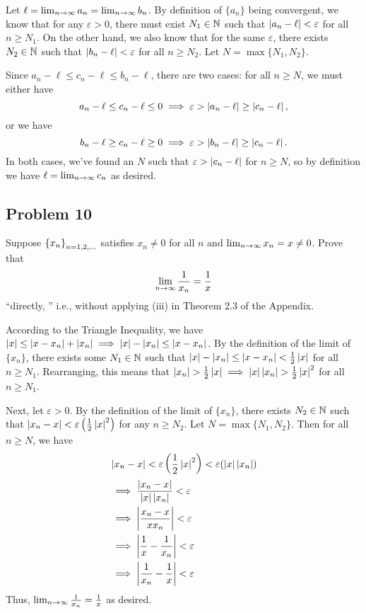 \documentclass[main.tex]{subfiles}
\begin{document}
\begin{soln}
    Let $\ell = \lim_{n\to \infty} a_n = \lim_{n\to \infty} b_n$. By definition of $\{a_n\}$ being convergent, we know that for any $\varepsilon > 0$, there must exist $N_1\in \mathbb N$ such that $\left\lvert a_n - \ell \right\rvert < \varepsilon$ for all $n\ge N_1$. On the other hand, we also know that for the same $\varepsilon$, there exists $N_2\in \mathbb N$ such that $\left\lvert b_n - \ell \right\rvert < \varepsilon$ for all $n\ge N_2$. Let $N = \max \{N_1, N_2\}$.
    
    Since $a_n - \ell \le c_n - \ell \le b_n - \ell$, there are two cases: for all $n\ge N$, we must either have
    \[a_n - \ell \le c_n - \ell \le 0\implies \varepsilon > \left\lvert a_n - \ell \right\rvert \ge \left\lvert c_n - \ell \right\rvert,\]
    or we have
    \[b_n - \ell \ge c_n - \ell \ge 0\implies \varepsilon > \left\lvert b_n - \ell \right\rvert \ge \left\lvert c_n - \ell \right\rvert.\]
    In both cases, we've found an $N$ such that $\varepsilon > \left\lvert c_n - \ell \right\rvert$ for $n\ge N$, so by definition we have $\ell = \lim_{n\to \infty} c_n$ as desired.
\end{soln}
\eject

\subsection{Problem 10}
\begin{claim}
    Suppose $\left\{ x_n \right\}_{n=1,2,\ldots}$ satisfies $x_n \neq 0$ for all $n$ and $\lim_{n\to \infty} x_n = x \neq 0$. Prove that
    \[\lim_{n\to \infty}\frac{1}{x_n} = \frac{1}{x}\]
    “directly, ” i.e., without applying (iii) in Theorem 2.3 of the Appendix.
\end{claim}

\begin{soln}
    According to the Triangle Inequality, we have $\left\lvert x \right\rvert\le \left\lvert x - x_n \right\rvert + \left\lvert x_n \right\rvert\implies \left\lvert x \right\rvert - \left\lvert x_n \right\rvert \le \left\lvert x - x_n \right\rvert$. By the definition of the limit of $\{x_n\}$, there exists some $N_1\in \mathbb N$ such that $\left\lvert x \right\rvert - \left\lvert x_n \right\rvert \le \left\lvert x - x_n \right\rvert < \frac{1}{2}\left\lvert x \right\rvert$ for all $n\ge N_1$. Rearranging, this means that $\left\lvert x_n \right\rvert > \frac{1}{2}\left\lvert x \right\rvert\implies \left\lvert x \right\rvert\left\lvert x_n \right\rvert > \frac{1}{2}\left\lvert x \right\rvert^2$ for all $n\ge N_1$.
    
    Next, let $\varepsilon > 0$. By the definition of the limit of $\{x_n\}$, there exists $N_2\in \mathbb N$ such that $\left\lvert x_n - x \right\rvert < \varepsilon\left(\frac{1}{2}\left\lvert x \right\rvert^2\right)$ for any $n\ge N_2$. Let $N = \max\{N_1, N_2\}$. Then for all $n\ge N$, we have
    \begin{align*}
        &\left\lvert x_n - x \right\rvert < \varepsilon\left(\frac{1}{2}\left\lvert x \right\rvert^2\right) < \varepsilon(\left\lvert x \right\rvert\left\lvert x_n \right\rvert) \\
        &\implies \frac{\left\lvert x_n - x \right\rvert}{\left\lvert x \right\rvert\left\lvert x_n \right\rvert} < \varepsilon \\
        &\implies \left\lvert \frac{x_n - x}{xx_n} \right\rvert < \varepsilon \\
        &\implies \left\lvert \frac{1}{x} - \frac{1}{x_n} \right\rvert < \varepsilon \\ 
        &\implies \left\lvert \frac{1}{x_n} - \frac{1}{x} \right\rvert < \varepsilon
    \end{align*}
    Thus, $\lim_{n\to \infty} \frac{1}{x_n} = \frac{1}{x}$ as desired.
\end{soln}
\eject
\end{document}
